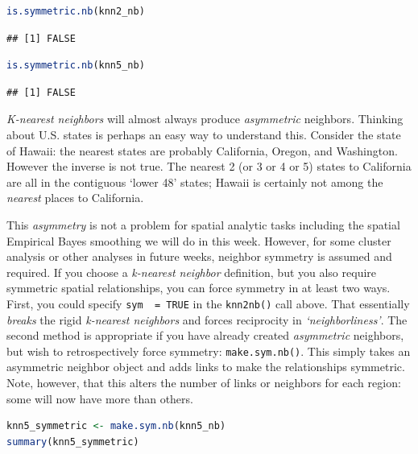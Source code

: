 \documentclass[
]{book}
\newcommand{\passthrough}[1]{#1}
\begin{document}
\begin{lstlisting}[language=R]
is.symmetric.nb(knn2_nb)
\end{lstlisting}

\begin{lstlisting}
## [1] FALSE
\end{lstlisting}

\begin{lstlisting}[language=R]
is.symmetric.nb(knn5_nb)
\end{lstlisting}

\begin{lstlisting}
## [1] FALSE
\end{lstlisting}

\emph{K-nearest neighbors} will almost always produce \emph{asymmetric} neighbors. Thinking about U.S. states is perhaps an easy way to understand this. Consider the state of Hawaii: the nearest states are probably California, Oregon, and Washington. However the inverse is not true. The nearest 2 (or 3 or 4 or 5) states to California are all in the contiguous `lower 48' states; Hawaii is certainly not among the \emph{nearest} places to California.

This \emph{asymmetry} is not a problem for spatial analytic tasks including the spatial Empirical Bayes smoothing we will do in this week. However, for some cluster analysis or other analyses in future weeks, neighbor symmetry is assumed and required. If you choose a \emph{k-nearest neighbor} definition, but you also require symmetric spatial relationships, you can force symmetry in at least two ways. First, you could specify \passthrough{\lstinline!sym  = TRUE!} in the \passthrough{\lstinline!knn2nb()!} call above. That essentially \emph{breaks} the rigid \emph{k-nearest neighbors} and forces reciprocity in \emph{`neighborliness'}. The second method is appropriate if you have already created \emph{asymmetric} neighbors, but wish to retrospectively force symmetry: \passthrough{\lstinline!make.sym.nb()!}. This simply takes an asymmetric neighbor object and adds links to make the relationships symmetric. Note, however, that this alters the number of links or neighbors for each region: some will now have more than others.

\begin{lstlisting}[language=R]
knn5_symmetric <- make.sym.nb(knn5_nb)
summary(knn5_symmetric)
\end{lstlisting}
\end{document}
